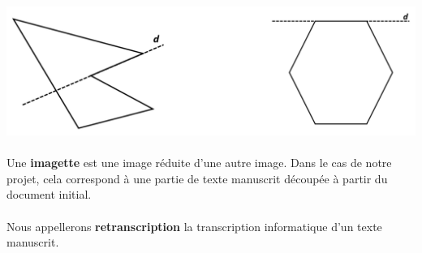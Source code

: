 \paragraph{}
\begin{mdframed}[frametitle={Exemples de polygones concave (à gauche) et convexe (à droite)}, innerbottommargin=10]
\begin{center}
\includegraphics[width=\linewidth]{polygone.png}
\end{center}
\end{mdframed}

\paragraph{}
Une \textbf{imagette} est une image réduite d'une autre image. Dans le cas de notre projet,
cela correspond à une partie de texte manuscrit découpée à partir du document initial.

\paragraph{}
Nous appellerons \textbf{retranscription} la transcription informatique d’un texte manuscrit.